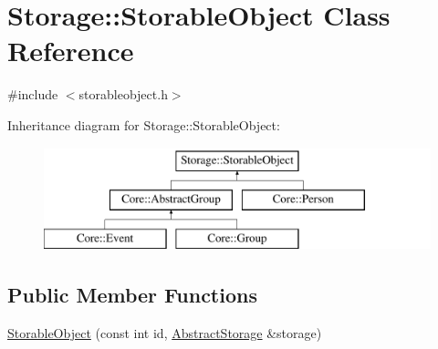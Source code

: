 \hypertarget{classStorage_1_1StorableObject}{
\section{Storage::StorableObject Class Reference}
\label{d4/deb/classStorage_1_1StorableObject}
}


{\ttfamily \#include $<$storableobject.h$>$}

Inheritance diagram for Storage::StorableObject:\begin{figure}[H]
\begin{center}
\leavevmode
\includegraphics[height=3.000000cm]{d4/deb/classStorage_1_1StorableObject}
\end{center}
\end{figure}
\subsection*{Public Member Functions}
\begin{DoxyCompactItemize}
\item 
\hyperlink{classStorage_1_1StorableObject_ac55bb0a7b94a98ff8f14e4164150ecb0}{StorableObject} (const int id, \hyperlink{classStorage_1_1AbstractStorage}{AbstractStorage} \&storage)
\end{DoxyCompactItemize}
